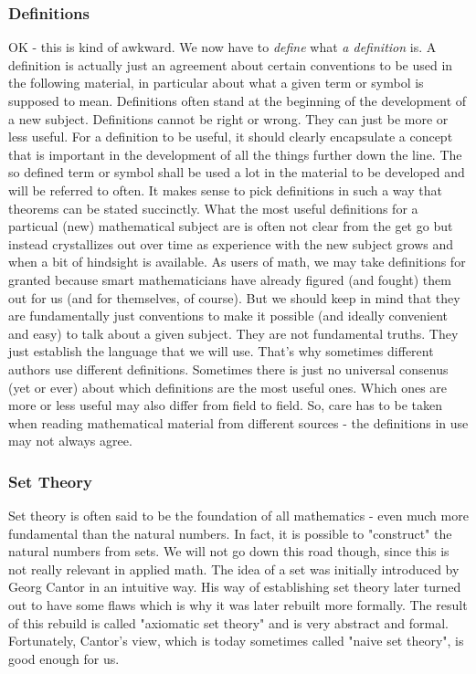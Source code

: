 \subsubsection{Definitions}
OK - this is kind of awkward. We now have to \emph{define} what \emph{a definition} is. A definition is actually just an agreement about certain conventions to be used in the following material, in particular about what a given term or symbol is supposed to mean. Definitions often stand at the beginning of the development of a new subject. Definitions cannot be right or wrong. They can just be more or less useful. For a definition to be useful, it should clearly encapsulate a concept that is important in the development of all the things further down the line. The so defined term or symbol shall be used a lot in the material to be developed and will be referred to often. It makes sense to pick definitions in such a way that theorems can be stated succinctly. What the most useful definitions for a particual (new) mathematical subject are is often not clear from the get go but instead crystallizes out over time as experience with the new subject grows and when a bit of hindsight is available. As users of math, we may take definitions for granted because smart mathematicians have already figured (and fought) them out for us (and for themselves, of course). But we should keep in mind that they are fundamentally just conventions to make it possible (and ideally convenient and easy) to talk about a given subject. They are not fundamental truths. They just establish the language that we will use. That's why sometimes different authors use different definitions. Sometimes there is just no universal consenus (yet or ever) about which definitions are the most useful ones. Which ones are more or less useful may also differ from field to field. So, care has to be taken when reading mathematical material from different sources - the definitions in use may not always agree.

\subsubsection{Set Theory}
Set theory is often said to be the foundation of all mathematics - even much more fundamental than the natural numbers. In fact, it is possible to "construct" the natural numbers from sets. We will not go down this road though, since this is not really relevant in applied math. The idea of a set was initially introduced by Georg Cantor in an intuitive way. His way of establishing set theory later turned out to have some flaws which is why it was later rebuilt more formally. The result of this rebuild is called "axiomatic set theory" and is very abstract and formal. Fortunately, Cantor's view, which is today sometimes called "naive set theory", is good enough for us. 

